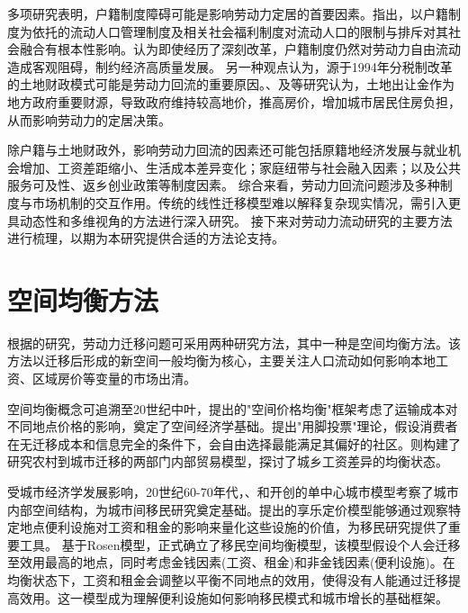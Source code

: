 \documentclass[a4paper, zihao=-4, fontset = mac, oneside]{ctexbook} %
\begin{document}
多项研究表明，户籍制度障碍可能是影响劳动力定居的首要因素。\textcite{RenYuanChengShiLiuDongRenKouDeSheHuiRongHeWenXianShuPing2006}指出，以户籍制度为依托的流动人口管理制度及相关社会福利制度对流动人口的限制与排斥对其社会融合有根本性影响。\textcite{LuYiLongHuKouHuanQiZuoYongMaHuJiZhiDuYuSheHuiFenCengHeLiuDong2008}认为即使经历了深刻改革，户籍制度仍然对劳动力自由流动造成客观阻碍，制约经济高质量发展。
另一种观点认为，源于1994年分税制改革的土地财政模式可能是劳动力回流的重要原因。\textcite{ChenYingFangNongMinGongZhiDuAnPaiYuShenFenRenTong2005}、\textcite{niehuihuaZhongguogaofangjiadexinzhengzhijingjixuejieshiYiZhengqihemou2013}及\textcite{YuJianXingDiFangFaZhanXingZhengFuDeXingWeiLuoJiJiZhiDuJiChu2012}等研究认为，土地出让金作为地方政府重要财源，导致政府维持较高地价，推高房价，增加城市居民住房负担，从而影响劳动力的定居决策。

除户籍与土地财政外，影响劳动力回流的因素还可能包括原籍地经济发展与就业机会增加、工资差距缩小、生活成本差异变化；家庭纽带与社会融入因素；以及公共服务可及性、返乡创业政策等制度因素。
综合来看，劳动力回流问题涉及多种制度与市场机制的交互作用。传统的线性迁移模型难以解释复杂现实情况，需引入更具动态性和多维视角的方法进行深入研究。
接下来对劳动力流动研究的主要方法进行梳理，以期为本研究提供合适的方法论支持。


\section{空间均衡方法}

根据\textcite{jiaEconomicsInternalMigration2023}的研究，劳动力迁移问题可采用两种研究方法，其中一种是空间均衡方法。该方法以迁移后形成的新空间一般均衡为核心，主要关注人口流动如何影响本地工资、区域房价等变量的市场出清。

空间均衡概念可追溯至20世纪中叶，\textcite{samuelsonSpatialPriceEquilibrium1952}提出的"空间价格均衡"框架考虑了运输成本对不同地点价格的影响，奠定了空间经济学基础。\textcite{tieboutPureTheoryLocal1956}提出"用脚投票"理论，假设消费者在无迁移成本和信息完全的条件下，会自由选择最能满足其偏好的社区。\textcite{harrisMigrationUnemploymentDevelopment1970}则构建了研究农村到城市迁移的两部门内部贸易模型，探讨了城乡工资差异的均衡状态。

受城市经济学发展影响，20世纪60-70年代，\textcite{alonsoLocationLandUse1964}、\textcite{muthCitiesHousingSpatial1969}和\textcite{millsAggregativeModelResource1967}开创的单中心城市模型考察了城市内部空间结构，为城市间移民研究奠定基础。\textcite{rosenHedonicPricesImplicit1974}提出的享乐定价模型能够通过观察特定地点便利设施对工资和租金的影响来量化这些设施的价值，为移民研究提供了重要工具。
基于Rosen模型，\textcite{robackWagesRentsQuality1982}正式确立了移民空间均衡模型，该模型假设个人会迁移至效用最高的地点，同时考虑金钱因素(工资、租金)和非金钱因素(便利设施)。在均衡状态下，工资和租金会调整以平衡不同地点的效用，使得没有人能通过迁移提高效用。这一模型成为理解便利设施如何影响移民模式和城市增长的基础框架。
\end{document}
